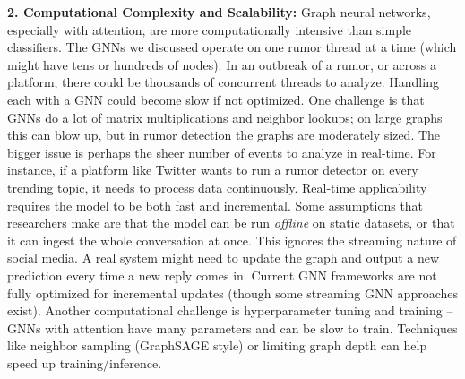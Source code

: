 \documentclass[12pt,a4paper]{report}
\begin{document}
\textbf{2. Computational Complexity and Scalability:} Graph neural networks, especially with attention, are more computationally intensive than simple classifiers. The GNNs we discussed operate on one rumor thread at a time (which might have tens or hundreds of nodes). In an outbreak of a rumor, or across a platform, there could be thousands of concurrent threads to analyze. Handling each with a GNN could become slow if not optimized. One challenge is that GNNs do a lot of matrix multiplications and neighbor lookups; on large graphs this can blow up, but in rumor detection the graphs are moderately sized. The bigger issue is perhaps the sheer number of events to analyze in real-time. For instance, if a platform like Twitter wants to run a rumor detector on every trending topic, it needs to process data continuously. Real-time applicability requires the model to be both fast and incremental. Some assumptions that researchers make are that the model can be run \textit{offline} on static datasets, or that it can ingest the whole conversation at once. This ignores the streaming nature of social media. A real system might need to update the graph and output a new prediction every time a new reply comes in. Current GNN frameworks are not fully optimized for incremental updates (though some streaming GNN approaches exist). Another computational challenge is hyperparameter tuning and training – GNNs with attention have many parameters and can be slow to train. Techniques like neighbor sampling (GraphSAGE style) or limiting graph depth can help speed up training/inference.
\end{document}
